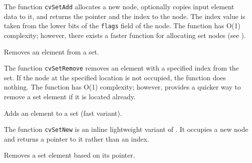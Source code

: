 The function \texttt{cvSetAdd} allocates a new node, optionally copies
input element data to it, and returns the pointer and the index to the
node. The index value is taken from the lower bits of the \texttt{flags}
field of the node. The function has O(1) complexity; however, there exists
a faster function for allocating set nodes (see ).

\label{SetRemove}

Removes an element from a set.


\begin{description}
\end{description}

The function \texttt{cvSetRemove} removes an element with a specified
index from the set. If the node at the specified location is not occupied,
the function does nothing. The function has O(1) complexity; however,
 provides a quicker way to remove a set element
if it is located already.

\label{SetNew}

Adds an element to a set (fast variant).


\begin{description}
\end{description}


The function \texttt{cvSetNew} is an inline lightweight variant of . It occupies a new node and returns a pointer to it rather than an index.


\label{SetRemoveByPtr}

Removes a set element based on its pointer.


